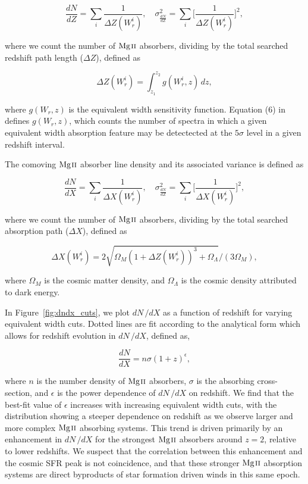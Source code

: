 \documentclass[iop,apj,numberedappendix,appendixfloats,twocolappendix]{emulateapj}
\begin{document}
\begin{equation}
\frac{d N}{d Z} = \sum_{i}\frac{1}{\Delta Z(W_r^i)},\quad \sigma^2_{\frac{d N}{d Z}} = \sum_{i} \Big[\frac{1}{\Delta Z(W_r^i)}\Big]^2,
\label{eqn:dndz}
\end{equation}

where we count the number of ${\hbox{{\rm Mg}\kern 0.1em{\sc ii}}}$ absorbers, dividing by the total searched redshift path length ($\Delta Z$), defined as

\begin{equation}
\Delta Z(W_r^i) = \int_{z_1}^{z_2} g(W_r^i, z)\,dz,
\label{eqn:deltaz}
\end{equation}

where $g(W_r, z)$ is the equivalent width sensitivity function. Equation (6) in \cite{Lanzetta1987} defines $g(W_r, z)$, which counts the number of spectra in which a given equivalent width absorption feature may be detectected at the $5\sigma$ level in a given redshift interval. 



The comoving ${\hbox{{\rm Mg}\kern 0.1em{\sc ii}}}$ absorber line density and its associated variance is defined as

\begin{equation}
\frac{d N}{d X} = \sum_{i}\frac{1}{\Delta X(W_r^i)},\quad \sigma^2_{\frac{d N}{d Z}} = \sum_{i} \Big[\frac{1}{\Delta X(W_r^i)}\Big]^2,
\label{eqn:dndx}
\end{equation}

where we count the number of ${\hbox{{\rm Mg}\kern 0.1em{\sc ii}}}$ absorbers, dividing by the total searched absorption path ($\Delta X$), defined as

\begin{equation}
\Delta X(W_r^i) = 2 \sqrt{\Omega_M (1 + \Delta Z(W_r^i))^3 + \Omega_{\Lambda}} / (3 \Omega_M),
\label{eqn:deltax}
\end{equation}

where $\Omega_M$ is the cosmic matter density, and $\Omega_{\Lambda}$ is the cosmic density attributed to dark energy.

In Figure~\ref{fig:dndx_cuts}, we plot $dN\,/dX$ as a function of redshift for varying equivalent width cuts. Dotted lines are fit according to the analytical form which allows for redshift evolution in $dN\,/dX$, defined as,

\begin{equation}
\frac{dN}{dX} = n\sigma (1 + z)^{\epsilon},
\label{eqn:dndxfit}
\end{equation}

where $n$ is the number density of ${\hbox{{\rm Mg}\kern 0.1em{\sc ii}}}$ absorbers, $\sigma$ is the absorbing cross-section, and $\epsilon$ is the power dependence of $dN\,/dX$ on redshift. We find that the best-fit value of $\epsilon$ increases with increasing equivalent width cuts, with the distribution showing a steeper dependence on redshift as we observe larger and more complex ${\hbox{{\rm Mg}\kern 0.1em{\sc ii}}}$ absorbing systems. This trend is driven primarily by an enhancement in $dN\,/dX$ for the strongest ${\hbox{{\rm Mg}\kern 0.1em{\sc ii}}}$ absorbers around $z = 2$, relative to lower redshifts. We suspect that the correlation between this enhancement and the cosmic SFR peak is not coincidence, and that these stronger ${\hbox{{\rm Mg}\kern 0.1em{\sc ii}}}$ absorption systems are direct byproducts of star formation driven winds in this same epoch. 
\end{document}
